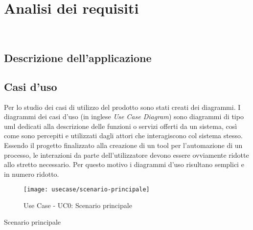 \chapter{Analisi dei requisiti}
\label{cap:analisi-requisiti}

\\

\section{Descrizione dell'applicazione}

\section{Casi d'uso}

Per lo studio dei casi di utilizzo del prodotto sono stati creati dei diagrammi.
I diagrammi dei casi d'uso (in inglese \emph{Use Case Diagram}) sono diagrammi di tipo \gls{uml} dedicati alla descrizione delle funzioni o servizi offerti da un sistema, così come sono percepiti e utilizzati dagli attori che interagiscono col sistema stesso.
Essendo il progetto finalizzato alla creazione di un tool per l'automazione di un processo, le interazioni da parte dell'utilizzatore devono essere ovviamente ridotte allo stretto necessario. Per questo motivo i diagrammi d'uso risultano semplici e in numero ridotto.

\begin{figure}[!h] 
    \centering 
    \texttt{[image: usecase/scenario-principale]} 
    \caption{Use Case - UC0: Scenario principale}
\end{figure}

\begin{usecase}{0}{Scenario principale}
\label{uc:scenario-principale}
\end{usecase}


